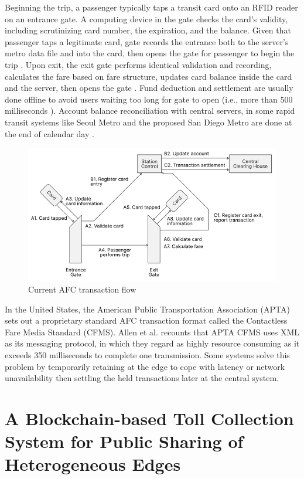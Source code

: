 \documentclass[a4paper,12pt,oneside, utf8x]{report}
\begin{document}
Beginning the trip, a passenger typically taps a transit card onto an RFID reader on an entrance gate. A computing device in the gate checks the card’s validity, including scrutinizing card number, the expiration, and the balance. Given that passenger taps a legitimate card, gate records the entrance both to the server’s metro data file and into the card, then opens the gate for passenger to begin the trip \cite{a6}. Upon exit, the exit gate performs identical validation and recording, calculates the fare based on fare structure, updates card balance inside the card and the server, then opens the gate \cite{a13}. Fund deduction and settlement are usually done offline to avoid users waiting too long for gate to open (i.e., more than 500 milliseconds \cite{a14}). Account balance reconciliation with central servers, in some rapid transit systems like Seoul Metro and the proposed San Diego Metro are done at the end of calendar day \cite{a13,a15}.

    \begin{figure}[H]
        \centering
        \includegraphics[width=.96\textwidth]{figures/2-2.png}
        \caption{Current AFC transaction flow}
        \label{f22currentaafc}
    \end{figure}
    
In the United States, the American Public Transportation Association (APTA) sets out a proprietary standard AFC transaction format called the Contactless Fare Media Standard (CFMS). Allen et al. \cite{a17} recounts that APTA CFMS uses XML as its messaging protocol, in which they regard as highly resource consuming as it exceeds 350 milliseconds to complete one transmission. Some systems solve this problem by temporarily retaining at the edge to cope with latency or network unavailability \cite{a4} then settling the held transactions later at the central system.

\section{A Blockchain-based Toll Collection System for Public Sharing of Heterogeneous Edges \cite{a18}}
\end{document}
